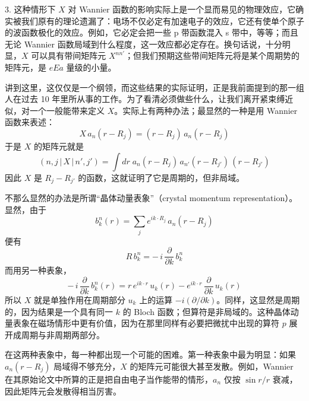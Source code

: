 3. 这种情形下 $X$ 对 Wannier 函数的影响实际上是一个显而易见的物理效应，它确实被我们原有的理论遗漏了：电场不仅必定有加速电子的效应，它还有使单个原子的波函数极化的效应。例如，它必定会把一些 p 带函数混入 s 带中，等等；而且无论 Wannier 函数局域到什么程度，这一效应都必定存在。换句话说，十分明显，$X$ 可以具有带间矩阵元 $X^{nn'}$；但我们预期这些带间矩阵元将是某个周期势的矩阵元，是 $eEa$ 量级的小量。


讲到这里，这仅仅是一个纲领，而这些结果的实际证明，正是我前面提到的那一组人在过去 10 年里所从事的工作。为了看清必须做些什么，让我们离开紧束缚近似，对一个一般能带来定义 $X$。实际上有两种办法；最显然的一种是用 Wannier 函数来表述：
\begin{equation*}
X\,a_n(r - R_j) = (r - R_j)\,a_n(r - R_j)
\end{equation*}
于是 $X$ 的矩阵元就是
\begin{equation*}
(n, j\,|\,X\,|\,n', j') = \int dr\; a_n(r - R_j)\,a_{n'}(r - R_{j'})\,(r - R_{j'})
\end{equation*}
因此 $X$ 是 $R_j - R_{j'}$ 的函数，这就证明了它是周期的，但非局域。

不那么显然的办法是所谓“晶体动量表象”（crystal momentum representation）。显然，由于
\begin{equation*}
b^n_k(r) = \sum_j e^{ik\cdot R_j}\,a_n(r - R_j)
\end{equation*}
便有
\begin{equation*}
R\,b^n_k = -\,i\,\frac{\partial}{\partial k}\,b^n_k
\end{equation*}
而用另一种表象，
\begin{equation*}
-\,i\,\frac{\partial}{\partial k}\,b^n_k(r) = r\,e^{ik\cdot r}\,u_k(r) - e^{ik\cdot r}\,\frac{\partial}{\partial k}\,u_k(r)
\end{equation*}
所以 $X$ 就是单独作用在周期部分 $u_k$ 上的运算 $-i(\partial/\partial k)$。同样，这显然是周期的，因为结果是一个具有同一 $k$ 的 Bloch 函数；但算符是非局域的。这种晶体动量表象在磁场情形中更有价值，因为在那里同样有必要把微扰中出现的算符 $p$ 展开成周期与非周期两部分。

在这两种表象中，每一种都出现一个可能的困难。第一种表象中最为明显：如果 $a_n(r - R_j)$ 局域得不够充分，$X$ 的矩阵元可能很大甚至发散。例如，Wannier 在其原始论文中所算的正是把自由电子当作能带的情形，$a_n$ 仅按 $\sin r/r$ 衰减，因此矩阵元会发散得相当厉害。

